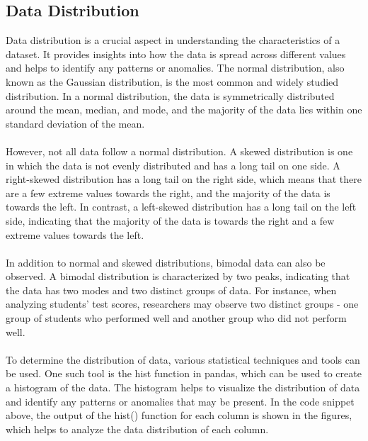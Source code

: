 \documentclass{report}
\begin{document}
\subsection{Data Distribution}
Data distribution is a crucial aspect in understanding the characteristics of a dataset. It provides insights into how the data is spread across different values and helps to identify any patterns or anomalies. The normal distribution, also known as the Gaussian distribution, is the most common and widely studied distribution. In a normal distribution, the data is symmetrically distributed around the mean, median, and mode, and the majority of the data lies within one standard deviation of the mean.\\
\\
However, not all data follow a normal distribution. A skewed distribution is one in which the data is not evenly distributed and has a long tail on one side. A right-skewed distribution has a long tail on the right side, which means that there are a few extreme values towards the right, and the majority of the data is towards the left. In contrast, a left-skewed distribution has a long tail on the left side, indicating that the majority of the data is towards the right and a few extreme values towards the left.\\
\\
In addition to normal and skewed distributions, bimodal data can also be observed. A bimodal distribution is characterized by two peaks, indicating that the data has two modes and two distinct groups of data. For instance, when analyzing students' test scores, researchers may observe two distinct groups - one group of students who performed well and another group who did not perform well.\\
\\
To determine the distribution of data, various statistical techniques and tools can be used. One such tool is the hist function in pandas, which can be used to create a histogram of the data. The histogram helps to visualize the distribution of data and identify any patterns or anomalies that may be present. In the code snippet above, the output of the hist() function for each column is shown in the figures, which helps to analyze the data distribution of each column. 
\end{document}
